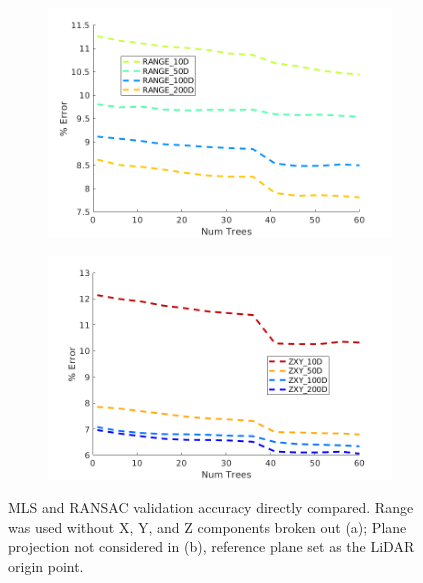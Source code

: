 \documentclass[numbered,pdftex]{ohio-etd}
\begin{document}
{		\begin{figure}[H]
			\centering
			\begin{subfigure}{0.45\textwidth}
				\centering
				\includegraphics[width=1\linewidth]{Defense_Images/Range_Vali_Error}
				\caption[]{}
				\label{fig:range_mls_ransac_comp}
			\end{subfigure}
			\begin{subfigure}{0.45\textwidth}
				\centering
				\includegraphics[width=1\linewidth]{Defense_Images/ZXY}
				\caption[]{}
				\label{fig:t20_mls_ransac_comp}
			\end{subfigure}
			\caption[MLS vs RANSAC Validation Accuracy (1)]{MLS and RANSAC validation accuracy directly compared. Range was used without X, Y, and Z components broken out (a); Plane projection not considered in (b), reference plane set as the LiDAR origin point.}
			\label{fig:xyz_mls_comp_2}
		\end{figure}

}
\end{document}
